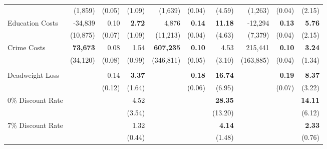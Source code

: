 \begin{tabular}{l r r r r r r r r r}
	&	(1,859)	&	(0.05)	&	(1.09)	&	(1,639)	&	(0.04)	&	(4.59)	&	(1,263)	&	(0.04)	&	(2.15)	\\
Education Costs	&	-34,839	&	0.10	&	\textbf{2.72}	&	4,876	&	\textbf{0.14}	&	\textbf{11.18}	&	-12,294	&	\textbf{0.13}	&	\textbf{5.76}	\\
	&	(10,875)	&	(0.07)	&	(1.09)	&	(11,213)	&	(0.04)	&	(4.63)	&	(7,379)	&	(0.04)	&	(2.15)	\\
Crime Costs	&	\textbf{73,673}	&	0.08	&	1.54	&	\textbf{607,235}	&	\textbf{0.10}	&	4.53	&	215,441	&	\textbf{0.10}	&	\textbf{3.24}	\\
	&	(34,120)	&	(0.08)	&	(0.99)	&	(346,811)	&	(0.05)	&	(3.10)	&	(163,885)	&	(0.04)	&	(1.34)	\\ \\
Deadweight Loss	&		&	0.14	&	\textbf{3.37}	&		&	\textbf{0.18}	&	\textbf{16.74}	&		&	\textbf{0.19}	&	\textbf{8.37}	\\
	&		&	(0.12)	&	(1.64)	&		&	(0.06)	&	(6.95)	&		&	(0.07)	&	(3.22)	\\
0\% Discount Rate	&		&		&	4.52	&		&		&	\textbf{28.35}	&		&		&	\textbf{14.11}	\\
	&		&		&	(3.54)	&		&		&	(13.20)	&		&		&	(6.12)	\\
7\% Discount Rate	&		&		&	1.32	&		&		&	\textbf{4.14}	&		&		&	\textbf{2.33}	\\
	&		&		&	(0.44)	&		&		&	(1.48)	&		&		&	(0.76)	\\
\bottomrule																			
\end{tabular}																			

